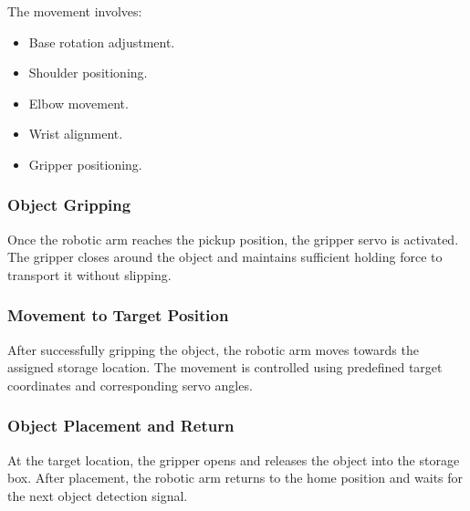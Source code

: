 The movement involves:

\begin{itemize}
    \item Base rotation adjustment.
    \item Shoulder positioning.
    \item Elbow movement.
    \item Wrist alignment.
    \item Gripper positioning.
\end{itemize}

\subsubsection{Object Gripping}

Once the robotic arm reaches the pickup position, the gripper servo is activated. The gripper closes around the object and maintains sufficient holding force to transport it without slipping.

\subsubsection{Movement to Target Position}

After successfully gripping the object, the robotic arm moves towards the assigned storage location. The movement is controlled using predefined target coordinates and corresponding servo angles.

\subsubsection{Object Placement and Return}

At the target location, the gripper opens and releases the object into the storage box. After placement, the robotic arm returns to the home position and waits for the next object detection signal.

